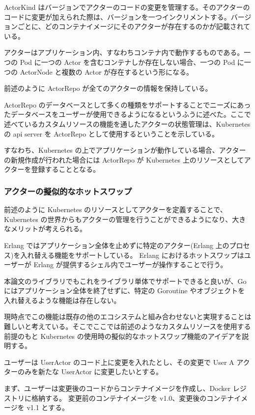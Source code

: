 ActorKind
はバージョンでアクターのコードの変更を管理する。そのアクターのコードに変更が加えられた際は、バージョンを一つインクリメントする。バージョンごとに、どのコンテナイメージにそのアクターが存在するのかが記載されている。

アクターはアプリケーション内、すなわちコンテナ内で動作するものである。一つの
Pod に一つの Actor を含むコンテナしか存在しない場合、一つの Pod に一つの
ActorNode と複数の Actor が存在するという形になる。

前述のように ActorRepo が全てのアクターの情報を保持している。

ActorRepo
のデータベースとして多くの種類をサポートすることでニーズにあったデータベースをユーザーが使用できるようになるというふうに述べた。ここで述べているカスタムリソースの機能を通したアクターの状態管理は、Kubernetes
の api server を ActorRepo として使用するということを示している。

すなわち、Kubernetes
の上でアプリケーションが動作している場合、アクターの新規作成が行われた場合には
ActorRepo が Kubernetes 上のリソースとしてアクターを登録することとなる。

\subsubsection{アクターの擬似的なホットスワップ}

前述のように Kubernetes
のリソースとしてアクターを定義することで、Kubernetes
の世界からもアクターの管理を行うことができるようになり、大きなメリットが考えられる。

Erlang ではアプリケーション全体を止めずに特定のアクター(Erlang
上のプロセス)を入れ替える機能をサポートしている。 Erlang
におけるホットスワップはユーザーが Erlang
が提供するシェル内でユーザーが操作することで行う。

本論文のライブラリでもこれをライブラリ単体でサポートできると良いが、Go
にはアプリケーション全体を終了せずに、特定の Goroutine
やオブジェクトを入れ替えるような機能は存在しない。

現時点でこの機能は既存の他のエコシステムと組み合わせないと実現することは難しいと考えている。そこでここでは前述のようなカスタムリソースを使用する前提のもと
Kubernetes の使用時の擬似的なホットスワップ機能のアイデアを説明する。

ユーザーは UserActor のコード上に変更を入れたとし、その変更で User A
アクターのみを新たな UserActor に変更したいとする。

まず、ユーザーは変更後のコードからコンテナイメージを作成し、Docker
レジストリに格納する。 変更前のコンテナイメージを
v1.0、変更後のコンテナイメージを v1.1 とする。

